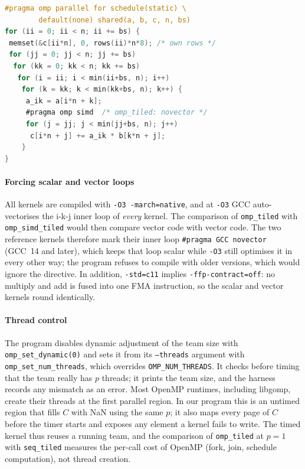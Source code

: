 \documentclass[conference,a4paper]{IEEEtran}
\newcommand{\code}[1]{\texttt{#1}}
\newcommand{\seqk}{\code{seq\_tiled}}
\newcommand{\ompk}{\code{omp\_tiled}}
\newcommand{\simdk}{\code{omp\_simd\_tiled}}
\begin{document}
\begin{lstlisting}[language=C, float=t, caption={\simdk{} (simplified). \ompk{} is identical except for the inner-loop directive; \seqk{} has neither the outer pragma nor the per-block clearing.}, label=lst:omp, captionpos=b]
#pragma omp parallel for schedule(static) \
        default(none) shared(a, b, c, n, bs)
for (ii = 0; ii < n; ii += bs) {
 memset(&c[ii*n], 0, rows(ii)*n*8); /* own rows */
 for (jj = 0; jj < n; jj += bs)
  for (kk = 0; kk < n; kk += bs)
   for (i = ii; i < min(ii+bs, n); i++)
    for (k = kk; k < min(kk+bs, n); k++) {
     a_ik = a[i*n + k];
     #pragma omp simd  /* omp_tiled: novector */
     for (j = jj; j < min(jj+bs, n); j++)
      c[i*n + j] += a_ik * b[k*n + j];
    }
}
\end{lstlisting}

\paragraph{Forcing scalar and vector loops} All kernels are compiled with
\code{-O3 -march=native}, and at \code{-O3} GCC auto-vectorises the i-k-j inner
loop of \emph{every} kernel. The comparison of \ompk{} with \simdk{} would then
compare vector code with vector code. The two reference kernels therefore mark
their inner loop \code{\#pragma GCC novector} (GCC~14 and later), which keeps
that loop scalar while \code{-O3} still optimises it in every other way; the
program refuses to compile with older versions, which would ignore the
directive. In addition, \code{-std=c11} implies \code{-ffp-contract=off}: no
multiply and add is fused into one FMA instruction, so the scalar and vector
kernels round identically.

\paragraph{Thread control} The program disables dynamic adjustment of the
team size with \code{omp\_set\_dynamic(0)} and sets it from its
\code{--threads} argument with \code{omp\_set\_num\_threads}, which
overrides \code{OMP\_NUM\_THREADS}. It checks before timing that the team
really has $p$ threads; it prints the team size, and the harness records any
mismatch as an error. Most OpenMP runtimes, including libgomp, create their
threads at the first parallel region. In our program this is an untimed
region that fills $C$ with NaN using the same $p$; it also maps every page of
$C$ before the timer starts and exposes any element a kernel fails to write.
The timed kernel thus reuses a running team, and the comparison of \ompk{} at
$p = 1$ with \seqk{} measures the per-call cost of OpenMP (fork, join, schedule
computation), not thread creation.
\end{document}
